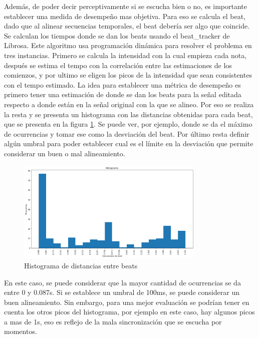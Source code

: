 \documentclass{article}
\begin{document}
Además, de poder decir perceptivamente si se escucha bien o no, es importante establecer una medida de desempeño mas objetiva. Para eso se calcula el beat, dado que al alinear secuencias temporales, el beat debería ser algo que coincide. Se calculan los tiempos donde se dan los beats usando el beat\_tracker de Librosa. Este algoritmo usa programación dinámica para resolver el problema en tres instancias. Primero se calcula la intensidad con la cual empieza cada nota, después se estima el tempo con la correlación entre las estimaciones de los comienzos, y por ultimo se eligen los picos de la intensidad que sean consistentes con el tempo estimado. 
La idea para establecer una métrica de desempeño es primero tener una estimación de donde se dan los beats para la señal editada respecto a donde están en la señal original con la que se alineo. Por eso se realiza la resta y se presenta un histograma con las distancias obtenidas para cada beat, que se presenta en la figura \ref{histograma}. Se puede ver, por ejemplo, donde se da el máximo de ocurrencias y tomar ese como la desviación del beat. Por último resta definir algún umbral para poder establecer cual es el límite en la desviación que permite considerar un buen o mal alineamiento. 

\begin{figure}[!h]
    \centering
    \includegraphics[width=0.80\textwidth]{histograma.png}
    \caption{Histograma de distancias entre beats}
    \label{histograma}
\end{figure}

En este caso, se puede considerar que la mayor cantidad de ocurrencias se da entre 0 y 0.087s. Si se establece un umbral de 100ms, se puede considerar un buen alineamiento. Sin embargo, para una mejor evaluación se podrían tener en cuenta los otros picos del histograma, por ejemplo en este caso, hay algunos picos a mas de 1s, eso es reflejo de la mala sincronización que se escucha por momentos. 
\end{document}

